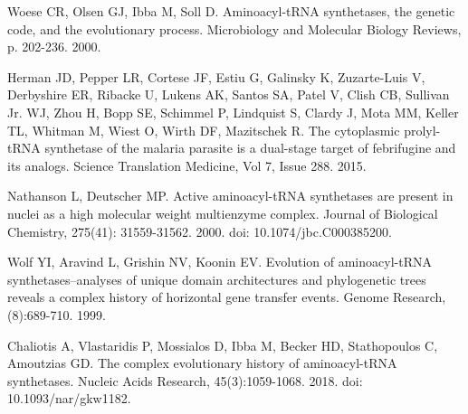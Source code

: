\documentclass[10pt,letterpaper]{article}
\begin{document}
%
%
% 
\begin{thebibliography}{10}



Woese CR, Olsen GJ, Ibba M, Soll D.
\newblock Aminoacyl-tRNA synthetases, the genetic code, and the evolutionary process.
\newblock Microbiology and Molecular Biology Reviews, p. 202-236. 2000.

Herman JD, Pepper LR, Cortese JF, Estiu G, Galinsky K, Zuzarte-Luis V, Derbyshire ER, Ribacke U, Lukens AK, Santos SA, Patel V, Clish CB, Sullivan Jr. WJ, Zhou H,
Bopp SE, Schimmel P, Lindquist S, Clardy J, Mota MM, Keller TL, Whitman M, Wiest O, Wirth DF, Mazitschek R. 
\newblock The cytoplasmic prolyl-tRNA synthetase of the malaria parasite is a dual-stage target of febrifugine and its analogs.
\newblock Science Translation Medicine, Vol 7, Issue 288. 2015.

Nathanson L, Deutscher MP.
\newblock Active aminoacyl-tRNA synthetases are present in nuclei as a high molecular weight multienzyme complex.
\newblock Journal of Biological Chemistry, 275(41): 31559-31562. 2000. doi: 10.1074/jbc.C000385200.

Wolf YI, Aravind L, Grishin NV, Koonin EV.
\newblock Evolution of aminoacyl-tRNA synthetases--analyses of unique domain architectures and phylogenetic trees reveals a complex history of horizontal gene transfer events.
\newblock Genome Research, (8):689-710. 1999.

Chaliotis A, Vlastaridis P, Mossialos D, Ibba M, Becker HD, Stathopoulos C, Amoutzias GD.
\newblock The complex evolutionary history of aminoacyl-tRNA synthetases.
\newblock Nucleic Acids Research, 45(3):1059-1068. 2018. doi: 10.1093/nar/gkw1182.


\end{thebibliography}
\end{document}
